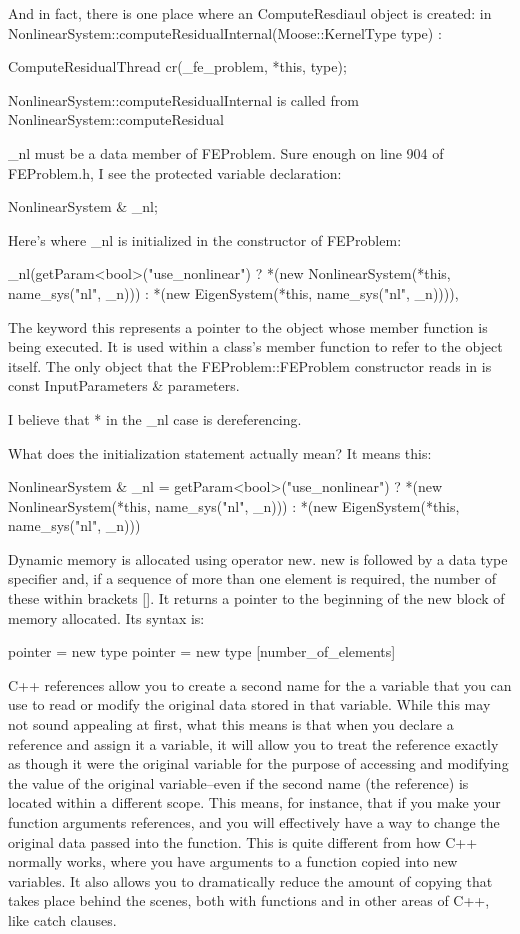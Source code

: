 {And in fact, there is one place where an ComputeResdiaul object is created: in NonlinearSystem::computeResidualInternal(Moose::KernelType type) :

    ComputeResidualThread cr(_fe_problem, *this, type);

NonlinearSystem::computeResidualInternal is called from NonlinearSystem::computeResidual

_nl must be a data member of FEProblem. Sure enough on line 904 of FEProblem.h, I see the protected variable declaration:

NonlinearSystem & _nl;

Here's where _nl is initialized in the constructor of FEProblem:

     _nl(getParam<bool>("use_nonlinear") ? *(new NonlinearSystem(*this, name_sys("nl", _n))) : *(new EigenSystem(*this, name_sys("nl", _n)))),

The keyword this represents a pointer to the object whose member function is being executed. It is used within a class's member function to refer to the object itself. The only object that the FEProblem::FEProblem constructor reads in is const InputParameters & parameters.

I believe that * in the _nl case is dereferencing.

What does the initialization statement actually mean? It means this:

NonlinearSystem & _nl = getParam<bool>("use_nonlinear") ? *(new NonlinearSystem(*this, name_sys("nl", _n))) : *(new EigenSystem(*this, name_sys("nl", _n)))

Dynamic memory is allocated using operator new. new is followed by a data type specifier and, if a sequence of more than one element is required, the number of these within brackets []. It returns a pointer to the beginning of the new block of memory allocated. Its syntax is:

pointer = new type
pointer = new type [number_of_elements]

C++ references allow you to create a second name for the a variable that you can use to read or modify the original data stored in that variable. While this may not sound appealing at first, what this means is that when you declare a reference and assign it a variable, it will allow you to treat the reference exactly as though it were the original variable for the purpose of accessing and modifying the value of the original variable--even if the second name (the reference) is located within a different scope. This means, for instance, that if you make your function arguments references, and you will effectively have a way to change the original data passed into the function. This is quite different from how C++ normally works, where you have arguments to a function copied into new variables. It also allows you to dramatically reduce the amount of copying that takes place behind the scenes, both with functions and in other areas of C++, like catch clauses.

}
